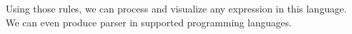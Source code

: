 \documentclass{article}
\begin{document}
Using those rules, we can process and visualize any expression in this language. We can even produce parser in supported programming languages.










\end{document}
